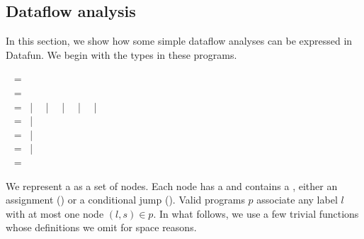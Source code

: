 

\subsection{Dataflow analysis}
\label{dataflow-analysis}


In this section, we show how some simple dataflow analyses can be
expressed in Datafun. We begin with the types in these programs.

\nopagebreak[2]
\begin{code}
  ~ = \tstring\\
  ~ = \tint\\
  ~ =  ~|~ 
  ~|~  ~|~  ~|~  ~|~ \\
  ~ =  \< ~|~  \<\tint\\
  ~ =
     \< ~|~
     \< \< \<\\
  ~ =
     \< \<
    ~|~  \< \< \<
  \\
  ~ = 
\end{code}

\noindent
We represent a  as a set of nodes. Each node has a
 and contains a , either an assignment
() or a conditional jump (). Valid programs $p$ associate
any label $l$ with at most one node $(l,s) \in p$. In what follows, we use a few
trivial functions whose definitions we omit for space reasons. 

\begin{code}
   \isa {} \to {}\\
   \isa \iso{} \to {}\\
   \isa \iso{} \to {}
\end{code}

